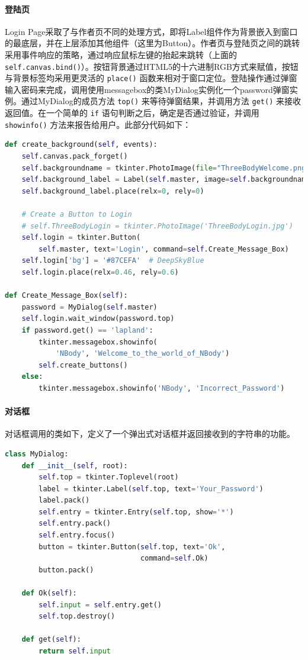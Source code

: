 \documentclass[]{report}
\begin{document}
		\paragraph{登陆页} Login Page采取了与作者页不同的处理方式，即将Label组件作为背景嵌入到窗口的最底层，并在上层添加其他组件（这里为Button）。作者页与登陆页之间的跳转采用事件响应的策略，通过响应鼠标左键的抬起来跳转（上面的 \verb|self.canvas.bind()|）。按钮背景通过HTML5的十六进制RGB方式来赋值，按钮与背景标签均采用更灵活的 \verb|place()| 函数来相对于窗口定位。登陆操作通过弹窗输入密码来完成，调用使用messagebox的类MyDialog实例化一个password弹窗实例。通过MyDialog的成员方法 \verb|top()| 来等待弹窗结果，并调用方法 \verb|get()| 来接收返回值。在一个简单的 \verb|if| 语句判断之后，确定是否通过验证，并调用 \verb|showinfo()| 方法来报告给用户。此部分代码如下：
		\begin{lstlisting}[language=python, basicstyle=\monaco]
def create_background(self, events):
	self.canvas.pack_forget()
	self.backgroundname = tkinter.PhotoImage(file="ThreeBodyWelcome.png")
	self.background_label = Label(self.master, image=self.backgroundname)
	self.background_label.place(relx=0, rely=0)

	# Create a Button to Login
	# self.ThreeBodyLogin = tkinter.PhotoImage('ThreeBodyLogin.jpg')
	self.login = tkinter.Button(
		self.master, text='Login', command=self.Create_Message_Box)
	self.login['bg'] = '#87CEFA'  # DeepSkyBlue
	self.login.place(relx=0.46, rely=0.6)

def Create_Message_Box(self):
	password = MyDialog(self.master)
	self.login.wait_window(password.top)
	if password.get() == 'lapland':
		tkinter.messagebox.showinfo(
			'NBody', 'Welcome_to_the_world_of_NBody')
		self.create_buttons()
	else:
		tkinter.messagebox.showinfo('NBody', 'Incorrect_Password')
		\end{lstlisting}
		\paragraph{对话框} 对话框调用的类如下，定义了一个弹出式对话框并返回接收到的字符串的功能。
		\begin{lstlisting}[language=python, basicstyle=\monaco]
class MyDialog:
	def __init__(self, root):
		self.top = tkinter.Toplevel(root)
		label = tkinter.Label(self.top, text='Your_Password')
		label.pack()
		self.entry = tkinter.Entry(self.top, show='*')
		self.entry.pack()
		self.entry.focus()
		button = tkinter.Button(self.top, text='Ok',
								command=self.Ok)
		button.pack()

	def Ok(self):
		self.input = self.entry.get()
		self.top.destroy()

	def get(self):
		return self.input
		\end{lstlisting}
\end{document}

